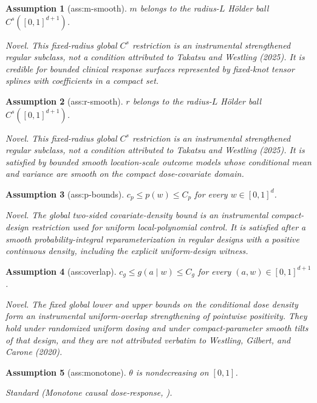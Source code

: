 \documentclass{article}
\newtheorem{assumption}{Assumption}
\begin{document}
\begin{assumption}[ass:m-smooth]\label{ass:m-smooth}
\(m\) belongs to the radius-\(L\) Hölder ball \(C^{s}([0,1]^{d+1})\).
\par\smallskip\noindent\emph{Novel.} This fixed-radius global \(C^s\) restriction is an instrumental strengthened regular subclass, not a condition attributed to Takatsu and Westling (2025). It is credible for bounded clinical response surfaces represented by fixed-knot tensor splines with coefficients in a compact set.
\end{assumption}

\begin{assumption}[ass:r-smooth]\label{ass:r-smooth}
\(r\) belongs to the radius-\(L\) Hölder ball \(C^{s}([0,1]^{d+1})\).
\par\smallskip\noindent\emph{Novel.} This fixed-radius global \(C^s\) restriction is an instrumental strengthened regular subclass, not a condition attributed to Takatsu and Westling (2025). It is satisfied by bounded smooth location-scale outcome models whose conditional mean and variance are smooth on the compact dose-covariate domain.
\end{assumption}

\begin{assumption}[ass:p-bounds]\label{ass:p-bounds}
\(c_p\le p(w)\le C_p\) for every \(w\in[0,1]^d\).
\par\smallskip\noindent\emph{Novel.} The global two-sided covariate-density bound is an instrumental compact-design restriction used for uniform local-polynomial control. It is satisfied after a smooth probability-integral reparameterization in regular designs with a positive continuous density, including the explicit uniform-design witness.
\end{assumption}

\begin{assumption}[ass:overlap]\label{ass:overlap}
\(c_g\le g(a\mid w)\le C_g\) for every \((a,w)\in[0,1]^{d+1}\).
\par\smallskip\noindent\emph{Novel.} The fixed global lower and upper bounds on the conditional dose density form an instrumental uniform-overlap strengthening of pointwise positivity. They hold under randomized uniform dosing and under compact-parameter smooth tilts of that design, and they are not attributed verbatim to Westling, Gilbert, and Carone (2020).
\end{assumption}

\begin{assumption}[ass:monotone]\label{ass:monotone}
\(\theta\) is nondecreasing on \([0,1]\).
\par\smallskip\noindent\emph{Standard} (Monotone causal dose-response, \cite{Doss2026PointwiseLR}).
\end{assumption}
\end{document}

